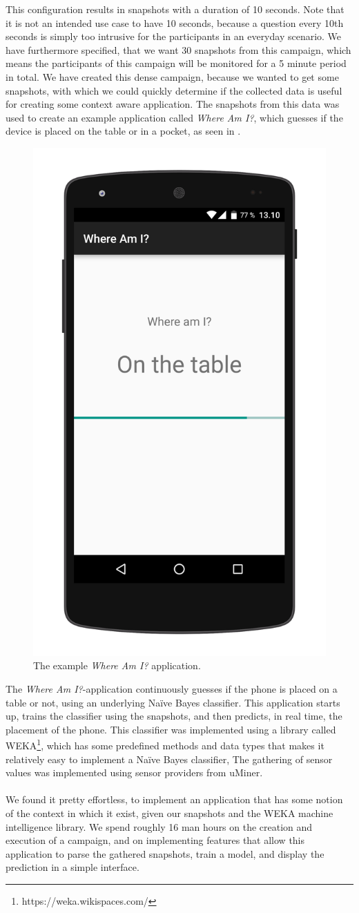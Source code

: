 This configuration results in snapshots with a duration of 10 seconds. Note that it is not an intended use case to have 10 seconds, because a question every 10th seconds is simply too intrusive for the participants in an everyday scenario. We have furthermore specified, that we want 30 snapshots from this campaign, which means the participants of this campaign will be monitored for a 5 minute period in total. We have created this dense campaign, because we wanted to get some snapshots, with which we could quickly determine if the collected data is useful for creating some context aware application. The snapshots from this data was used to create an example application called \emph{Where Am I?}, which guesses if the device is placed on the table or in a pocket, as seen in .

\begin{figure}[!htbp]
    \centering
    \includegraphics[width=.35\textwidth ]{graphic/quality_assurance/where_am_i_app.png}
    \caption{The example \emph{Where Am I?} application.}
    \label{fig:where_am_i_app}
\end{figure}
\FloatBarrier

The \emph{Where Am I?}-application continuously guesses if the phone is placed on a table or not, using an underlying Naïve Bayes classifier. This application starts up, trains the classifier using the snapshots, and then predicts, in real time, the placement of the phone. This classifier was implemented using a library called WEKA\footnote{https://weka.wikispaces.com/}, which has some predefined methods and data types that makes it relatively easy to implement a Naïve Bayes classifier, The gathering of sensor values was implemented using sensor providers from uMiner.
\\\\
We found it pretty effortless, to implement an application that has some notion of the context in which it exist, given our snapshots and the WEKA machine intelligence library. We spend roughly 16 man hours on the creation and execution of a campaign, and on implementing features that allow this application to parse the gathered snapshots, train a model, and display the prediction in a simple interface.
